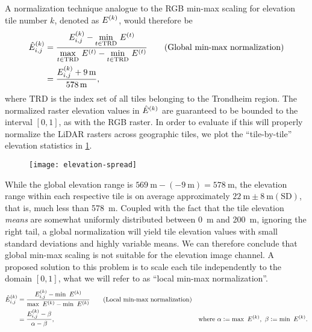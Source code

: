A normalization technique analogue to the RGB min-max scaling for elevation tile number $k$, denoted as $E^{(k)}$, would therefore be
\begin{align*}
  \hat{\lidarraster}_{i,j}^{(k)}
  &=
  \frac{%
    \lidarraster_{i,j}^{(k)} - \underset{t \in \mathrm{TRD}}{\min}~\lidarraster^{(t)}
  }{%
    \underset{t \in \mathrm{TRD}}{\max}~\lidarraster^{(t)} - \underset{t \in \mathrm{TRD}}{\min}~\lidarraster^{(t)}
  }
  \tag{Global min-max normalization}
  \\
  &=
  \frac{%
    \lidarraster_{i,j}^{(k)} + \SI{9}{\meter}
  }{%
    \SI{578}{\meter}
  },%
\end{align*}
%
where $\mathrm{TRD}$ is the index set of all tiles belonging to the Trondheim region.
The normalized raster elevation values in $\hat{E}^{(k)}$ are guaranteed to be bounded to the interval $[0, 1]$, as with the RGB raster.
In order to evaluate if this will properly normalize the LiDAR rasters across geographic tiles, we plot the \enquote{tile-by-tile} elevation statistics in \cref{fig:elevation-spread}.

\begin{figure}[H]
  \centering
  \texttt{[image: elevation-spread]}
  \label{fig:elevation-spread}
\end{figure}

While the global elevation range is $\SI{569}{\meter} - (\SI{-9}{\meter}) = \SI{578}{\meter}$, the elevation range within each respective tile is on average approximately $\SI{22}{\meter} \pm \SI{8}{\meter} (\mathrm{SD})$, that is, much less than \SI{578}{\meter}.
Coupled with the fact that the tile elevation \textit{means} are somewhat uniformly distributed between \SI{0}{\meter} and \SI{200}{\meter}, ignoring the right tail, a global normalization will yield tile elevation values with small standard deviations and highly variable means.
We can therefore conclude that global min-max scaling is not suitable for the elevation image channel.
A proposed solution to this problem is to scale each tile independently to the domain $[0, 1]$, what we will refer to as \enquote{local min-max normalization}.
%
\begin{align*}
  \hat{\lidarraster}_{i,j}^{(k)}
  &=
  \frac{%
    \lidarraster_{i,j}^{(k)} - \min~\lidarraster^{(k)}
  }{%
    \max~\lidarraster^{(k)} - \min~\lidarraster^{(k)}
  }%
  \tag{Local min-max normalization} %
  \\
  &=
  \frac{%
    \lidarraster_{i,j}^{(k)} - \beta
  }{%
    \alpha - \beta
  },%
  &\text{where }\alpha \defeq \max~\lidarraster^{(k)},~\beta \defeq \min~\lidarraster^{(k)}.
\end{align*}

